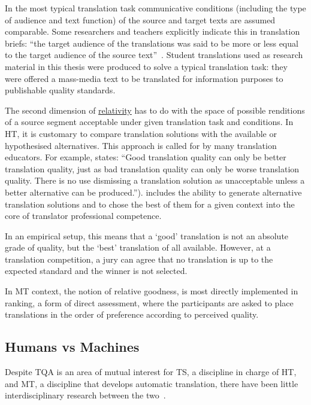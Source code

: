 In the most typical translation task communicative conditions (including the type of audience and text function) of the source and target texts are assumed comparable. Some researchers and teachers explicitly indicate this in translation briefs: ``the target audience of the translations was said to be more or less equal to the target audience of the source text''~\cite{Daems2013}. Student translations used as research material in this thesis were produced to solve a typical translation task: they were offered a mass-media text to be translated for information purposes to publishable quality standards.

The second dimension of \hyperlink{wd:relativity}{relativity} has to do with the space of possible renditions of a source segment acceptable under given translation task and conditions. In HT, it is customary to compare translation solutions with the available or hypothesised alternatives. 
This approach is called for by many translation educators. For example, \citet[p.172]{Bittner2020} states: ``Good translation quality can only be better translation quality, just as bad translation quality can only be worse translation quality. There is no use dismissing a translation solution as unacceptable unless a better alternative can be produced.''). \citet{Pym2003} includes the ability to generate alternative translation solutions and to chose the best of them for a given context into the core of translator professional competence. 

In an empirical setup, this means that a `good' translation is not an absolute grade of quality, but the `best' translation of all available. However, at a translation competition, a jury can agree that no translation is up to the expected standard and the winner is not selected.

In MT context, the notion of relative goodness, is most directly implemented in ranking, a form of direct assessment, where the participants are asked to place translations in the order of preference according to perceived quality.

\subsection{\label{ssec:versus}Humans vs Machines}
Despite \gls{TQA} is an area of mutual interest for TS, a discipline in charge of HT, and MT, a discipline that develops automatic translation, there have been little interdisciplinary research between the two~\cite{Ahrenberg2017}. 

